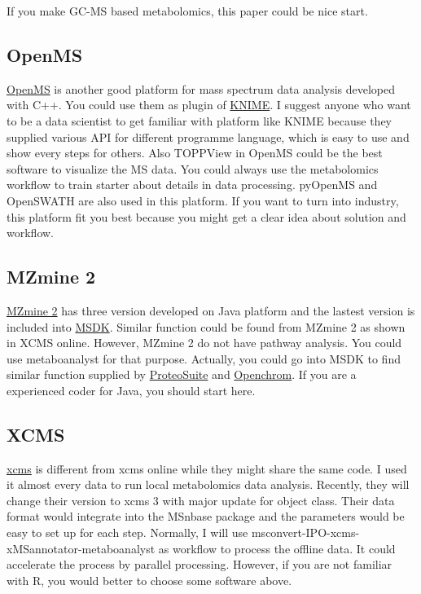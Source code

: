 \documentclass[
]{book}
\begin{document}
If you make GC-MS based metabolomics, this paper\citep{matsuo2017} could be nice start.

\hypertarget{openms}{%
\subsection{OpenMS}\label{openms}}

\href{https://www.openms.de/}{OpenMS} is another good platform for mass spectrum data analysis developed with C++. You could use them as plugin of \href{https://www.knime.org/}{KNIME}. I suggest anyone who want to be a data scientist to get familiar with platform like KNIME because they supplied various API for different programme language, which is easy to use and show every steps for others. Also TOPPView in OpenMS could be the best software to visualize the MS data. You could always use the metabolomics workflow to train starter about details in data processing. pyOpenMS and OpenSWATH are also used in this platform. If you want to turn into industry, this platform fit you best because you might get a clear idea about solution and workflow.

\hypertarget{mzmine-2}{%
\subsection{MZmine 2}\label{mzmine-2}}

\href{http://mzmine.github.io/}{MZmine 2} has three version developed on Java platform and the lastest version is included into \href{https://msdk.github.io/}{MSDK}. Similar function could be found from MZmine 2 as shown in XCMS online. However, MZmine 2 do not have pathway analysis. You could use metaboanalyst for that purpose. Actually, you could go into MSDK to find similar function supplied by \href{http://www.proteosuite.org}{ProteoSuite} and \href{https://www.openchrom.net/}{Openchrom}. If you are a experienced coder for Java, you should start here.

\hypertarget{xcms}{%
\subsection{XCMS}\label{xcms}}

\href{https://bioconductor.org/packages/release/bioc/html/xcms.html}{xcms} is different from xcms online while they might share the same code. I used it almost every data to run local metabolomics data analysis. Recently, they will change their version to xcms 3 with major update for object class. Their data format would integrate into the MSnbase package and the parameters would be easy to set up for each step. Normally, I will use msconvert-IPO-xcms-xMSannotator-metaboanalyst as workflow to process the offline data. It could accelerate the process by parallel processing. However, if you are not familiar with R, you would better to choose some software above.
\end{document}
